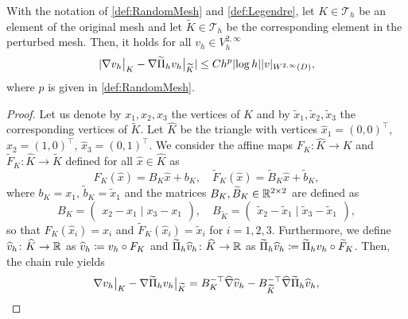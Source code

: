 \begin{lemma}\label{lem:Interp_BoundKKTilde} With the notation of \cref{def:RandomMesh} and \cref{def:Legendre}, let $K \in \mathcal T_h$ be an element of the original mesh and let $\widetilde K \in \mathcal T_h$ be the corresponding element in the perturbed mesh. Then, it holds for all $v_h \in V_h^{2, \infty}$
	\begin{equation}
		\lvert\nabla v_h\bigr\rvert_{K} - \nabla \widetilde \Pi_h v_h \bigr\rvert_{\widetilde K}\rvert \leq C h^p \lvert\log h\rvert \lvert v\rvert_{W^{2, \infty}(D)},
	\end{equation}
	where $p$ is given in \cref{def:RandomMesh}.
\end{lemma}
\begin{proof} Let us denote by $x_1, x_2, x_3$ the vertices of $K$ and by $\tilde x_1, \tilde x_2, \tilde x_3$ the corresponding vertices of $\widetilde K$. Let $\widehat K$ be the triangle with vertices $\hat x_1 = (0, 0)^\top$, $\hat x_2 = (1, 0)^\top$, $\hat x_3 = (0, 1)^\top$. We consider the affine maps $F_K \colon \widehat K \to K$ and $\widetilde F_K \colon \widehat K \to \widetilde K$ defined for all $\widehat x \in \widehat K$ as 
\begin{equation}
	F_K(\hat x) = B_K\hat x + b_K, \quad \widetilde F_K(\hat x) = \widetilde B_K\hat x + \tilde b_K,
\end{equation}
where $b_K = x_1$, $\tilde b_K = \tilde x_1$ and the matrices $B_K, \widetilde B_K \in \mathbb{R}^{2\times 2}$ are defined as
\begin{equation}
	B_K = \begin{pmatrix} x_2 - x_1 \mid x_3 - x_1 \end{pmatrix}, \quad B_{\widetilde K} = \begin{pmatrix} \tilde x_2 - \tilde x_1 \mid \tilde x_3 - \tilde x_1\end{pmatrix},
\end{equation}
so that $F_K(\widehat x_i) = x_i$ and $\widetilde F_K(\widehat x_i) = \tilde x_i$ for $i = 1, 2, 3$. Furthermore, we define $\widehat v_h \colon \widehat K \to \mathbb{R}$ as $\widehat v_h \coloneqq v_h \circ F_K$ and $\widetilde \Pi_h \widehat v_h\colon \widehat K \to \mathbb{R}$ as $\widetilde \Pi_h \widehat v_h \coloneqq \widetilde \Pi_h v_h \circ \widetilde F_K$. Then, the chain rule yields
\begin{equation}\label{eq:DiffMapToRef}
	\nabla v_h\bigr\rvert_{K} - \nabla \widetilde \Pi_h v_h \bigr\rvert_{\widetilde K} = B_K^{-\top} \widehat \nabla \widehat v_h - B_{\widetilde K}^{-\top} \widehat \nabla \widetilde \Pi_h \widehat v_h,
\end{equation}

\end{proof}
